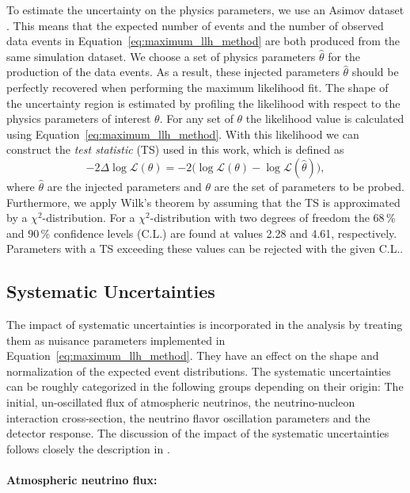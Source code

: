 To estimate the uncertainty on the physics parameters, we use an Asimov dataset \cite{2011EPJC...71.1554C}.
This means that the expected number of events and the number of observed data events in Equation~\ref{eq:maximum_llh_method} are both produced from the same simulation dataset.
We choose a set of physics parameters $\hat{\theta}$ for the production of the data events.
As a result, these injected parameters $\hat{\theta}$ should be perfectly recovered when performing the maximum likelihood fit. 
The shape of the uncertainty region is estimated by profiling the likelihood with respect to the physics parameters of interest $\theta$.
For any set of $\theta$ the likelihood value is calculated using Equation~\ref{eq:maximum_llh_method}.
With this likelihood we can construct the \textit{test statistic} (TS) used in this work, which is defined as
\begin{equation}
    -2\Delta \log\mathcal{L}(\theta) = -2\Big( \log\mathcal{L}(\theta) - \log\mathcal{L}(\hat\theta) \Big),
\end{equation}
where $\hat\theta$ are the injected parameters and $\theta$ are the set of parameters to be probed.
Furthermore, we apply Wilk's theorem \cite{wilks1938} by assuming that the TS is approximated by a $\chi^2$-distribution.
For a $\chi^2$-distribution with two degrees of freedom the $68$\,\% and $90$\,\% confidence levels (C.L.) are found at values 2.28 and 4.61, respectively. 
Parameters with a TS exceeding these values can be rejected with the given C.L..


\subsection{Systematic Uncertainties} \label{sec:systematics}

The impact of systematic uncertainties is incorporated in the analysis by treating them as nuisance parameters implemented in Equation~\ref{eq:maximum_llh_method}.
They have an effect on the shape and normalization of the expected event distributions.
The systematic uncertainties can be roughly categorized in the following groups depending on their origin:
The initial, un-oscillated flux of atmospheric neutrinos, the neutrino-nucleon interaction cross-section, the neutrino flavor oscillation parameters and the detector response.
The discussion of the impact of the systematic uncertainties follows closely the description in \cite{2019PhRvD..99c2007A}.


\paragraph{Atmospheric neutrino flux:}

